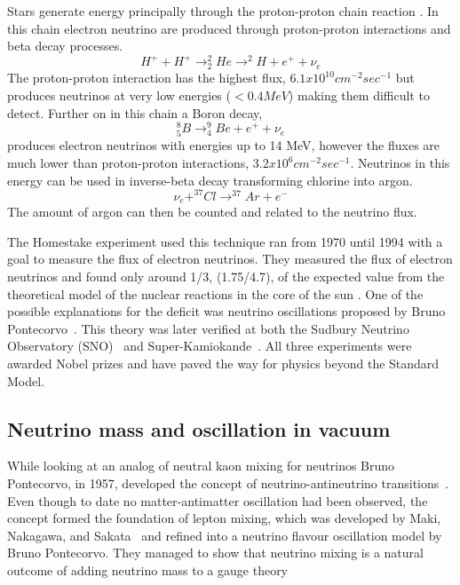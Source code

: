 Stars generate energy principally through the proton-proton chain reaction \cite{48Solar}. In this chain electron neutrino are produced through proton-proton interactions and beta decay processes. 
\begin{equation}
\label{eq:ppreaction}
H^+ + H^+ \rightarrow ^2_2He \rightarrow ^2H + e^+ + \nu_e
\end{equation}
The proton-proton interaction has the highest flux, $6.1 x 10^{10} cm^{-2} sec^{-1}$ but produces neutrinos at very low energies  ($<0.4 MeV$) making them difficult to detect. 
Further on in this chain a Boron decay,
\begin{equation}
\label{eq:BoronDecay}
^8_5B \rightarrow ^9_4 Be + e^+ + \nu_e
\end{equation}
produces electron neutrinos with energies up to 14 MeV, however the fluxes are much lower than proton-proton interactions, $3.2 x 10^6 cm^{-2} sec^{-1}$. Neutrinos in this energy can be used in inverse-beta decay transforming chlorine into argon.
\begin{equation}
\nu_e + ^{37} Cl \rightarrow ^{37} Ar + e^-
\end{equation}
The amount of argon can then be counted and related to the neutrino flux.

The Homestake experiment used this technique ran from 1970 until 1994 with a goal to measure the flux of electron neutrinos. They measured the flux of electron neutrinos and found only around 1/3, (1.75/4.7), of the expected value from the theoretical model of the nuclear reactions in the core of the sun \cite{9Davis}. One of the possible explanations for the deficit was neutrino oscillations proposed by Bruno Pontecorvo~\cite{11Pontecorvo}. This theory was later verified at both the Sudbury Neutrino Observatory (SNO)~\cite{Fix6} and Super-Kamiokande~\cite{10Fukuda}. All three experiments were awarded Nobel prizes and have paved the way for physics beyond the Standard Model.

\subsection{Neutrino mass and oscillation in vacuum}\label{subsection:Neutrinomassandoscillation}
While looking at an analog of neutral kaon mixing for neutrinos Bruno Pontecorvo, in 1957, developed the concept of neutrino-antineutrino transitions~\cite{11Pontecorvo}. Even though to date no matter-antimatter oscillation had been observed, the concept formed the foundation of lepton mixing, which was developed by Maki, Nakagawa, and Sakata~\cite{12Maki} and refined into a neutrino flavour oscillation model by Bruno Pontecorvo. They managed to show that neutrino mixing is a natural outcome of adding neutrino mass to a gauge theory~\cite{11Pontecorvo}

